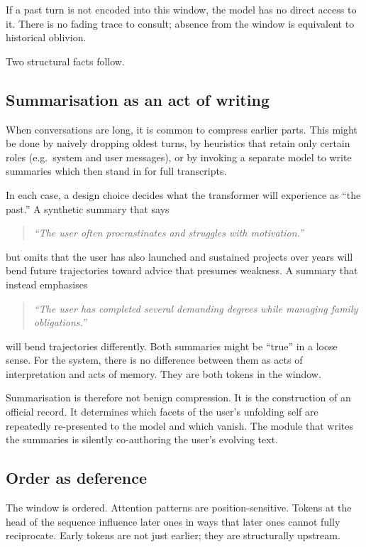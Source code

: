 \documentclass[12pt,a4paper]{article}
\begin{document}
If a past turn is not encoded into this window, the model has no direct access to it. There is no fading trace to consult; absence from the window is equivalent to historical oblivion.

Two structural facts follow.

\subsection*{Summarisation as an act of writing}

When conversations are long, it is common to compress earlier parts. This might be done by naively dropping oldest turns, by heuristics that retain only certain roles (e.g.\ system and user messages), or by invoking a separate model to write summaries which then stand in for full transcripts.

In each case, a design choice decides what the transformer will experience as ``the past.'' A synthetic summary that says

\begin{quote}
\emph{``The user often procrastinates and struggles with motivation.''}
\end{quote}

but omits that the user has also launched and sustained projects over years will bend future trajectories toward advice that presumes weakness. A summary that instead emphasises

\begin{quote}
\emph{``The user has completed several demanding degrees while managing family obligations.''}
\end{quote}

will bend trajectories differently. Both summaries might be ``true'' in a loose sense. For the system, there is no difference between them as acts of interpretation and acts of memory. They are both tokens in the window.

Summarisation is therefore not benign compression. It is the construction of an official record. It determines which facets of the user's unfolding self are repeatedly re-presented to the model and which vanish. The module that writes the summaries is silently co-authoring the user's evolving text.

\subsection*{Order as deference}

The window is ordered. Attention patterns are position-sensitive. Tokens at the head of the sequence influence later ones in ways that later ones cannot fully reciprocate. Early tokens are not just earlier; they are structurally upstream.
\end{document}
